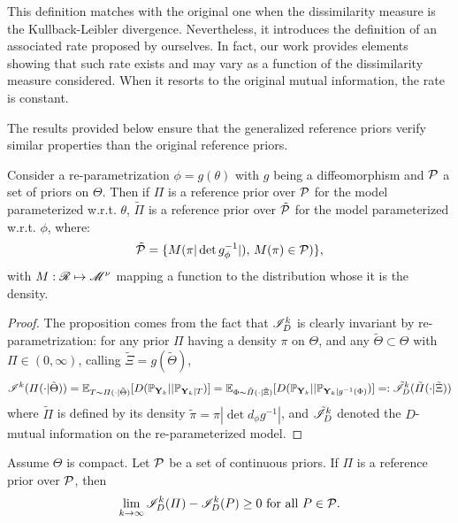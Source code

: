 This definition matches with the original one when the dissimilarity measure is the Kullback-Leibler divergence. Nevertheless, it introduces the definition of an associated rate proposed by ourselves. In fact, our
work provides elements showing that such rate exists and may vary as a function of the dissimilarity measure
considered. When it resorts to the original mutual information, the rate is constant.

The results provided below ensure that the generalized reference priors verify similar properties than the original reference priors.







\begin{prop}
    Consider a re-parametrization $\phi=g(\theta)$ with $g$ being a diffeomorphism and $\mathcal{P}$ a set of priors on $\Theta$.
    Then if $\varPi$ is  a reference prior over $\mathcal{P}$ for the model parameterized w.r.t. $\theta$, $\tilde{\varPi}$ is a reference prior over $\tilde{\mathcal{P}}$ for the model parameterized w.r.t. $\phi$, where: 
    \begin{equation}
        \tilde{\mathcal{P}} = \{ M(\pi |\det g_\phi^{-1}|),\,M(\pi)\in\mathcal{P} ) \},
    \end{equation}
    with $M:\mathscr{R}\mapsto\mathscr{M}^\nu$ mapping a function to the distribution whose it is the density.
\end{prop}

\begin{proof}
    The proposition comes from the fact that $\mathscr{I}^k_D$ is
    clearly invariant by re-parametrization: for any prior $\varPi$ having a density $\pi$ on $\Theta$, and any $\tilde\Theta\subset\Theta$ with $\varPi\in(0,\infty)$, calling $\tilde\Xi = g(\tilde\Theta) $,
        \begin{equation}
            \mathscr{I}^k(\varPi(\cdot|\tilde\Theta)) = \mathbb{E}_{T\sim\varPi(\cdot|\tilde\Theta)}[D(\mathbb{P}_{\mathbf{Y}_k}||\mathbb{P}_{\mathbf{Y}_k|T} )] = \mathbb{E}_{\Phi\sim\tilde\varPi(\cdot|\tilde\Xi)} [D(\mathbb{P}_{\mathbf{Y}_k}||\mathbb{P}_{\mathbf{Y}_k|g^{-1}(\Phi)} )] =: \tilde{\mathscr{I}}^k_D(\tilde\varPi(\cdot|\tilde\Xi))
        \end{equation}
    where $\tilde\varPi$ is defined by its density $\tilde\pi = \pi|\det d_\phi g^{-1}|$, and $\tilde{\mathscr{I}}^k_D$ denoted the $D$-mutual information on the re-parameterized model.
\end{proof}

\begin{prop}
    Assume $\Theta$ is compact. Let $\mathcal{P}$ be a set of continuous priors. If $\varPi$ is a reference prior over $\mathcal{P}$, then
        \begin{equation}
            \lim_{k\rightarrow\infty} \mathscr{I}_D^k(\varPi) -\mathscr{I}_D^k(P) \geq0 \text{\ for all\ } P\in\mathcal{P}.
        \end{equation}
\end{prop}

